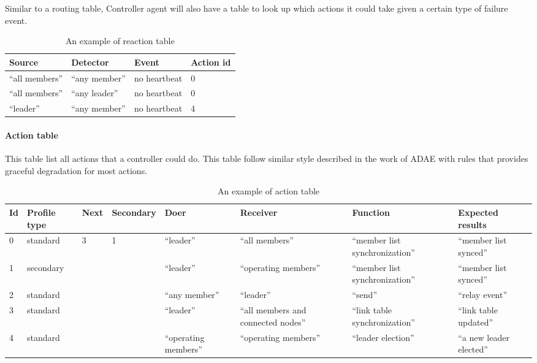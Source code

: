 Similar to a routing table, Controller agent will also have a table to look up which actions it could take given a certain type of failure event.

\begin{table}[h!]
\begin{center}
\begin{tabular}{llll}
Source & Detector & Event & Action id \\ 
\hline
“all members” & “any member” & no heartbeat & 0 \\ 
“all members” & “any leader” & no heartbeat & 0 \\
“leader” & “any member” & no heartbeat & 4 \\
\end{tabular}
\end{center}
\caption{An example of reaction table}
\end{table}


\paragraph{Action table}

This table list all actions that a controller could do. This table follow similar style described in the work of ADAE with rules that provides graceful degradation for most actions.

\begin{table}[h!]
\begin{center}
\begin{tabular}{llllllll}
Id & Profile type & Next & Secondary & Doer & Receiver & Function & Expected
results \\
\hline
0 & standard & 3 & 1 & “leader” & “all members” & “member list synchronization” & “member list synced” \\
1 & secondary &  &  & “leader” & “operating members” & “member list synchronization” & “member list synced” \\
2 & standard &  &  & “any member” & “leader” & “send” & “relay event” \\
3 & standard &  &  & “leader” & “all members and connected nodes” & “link table synchronization” & “link table updated” \\
4 & standard &  &  & “operating members” & “operating members” & “leader election” & “a new leader elected” \\
\end{tabular}
\end{center}
\caption{An example of action table}
\end{table}

